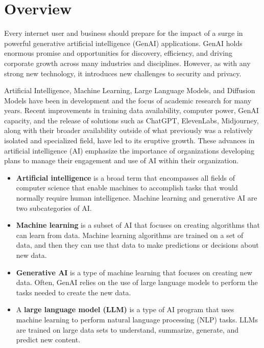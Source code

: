 \headerimage
\chapter{Overview}
Every internet user and business should prepare for the impact of a surge in
powerful generative artificial intelligence (GenAI) applications. GenAI holds
enormous promise and opportunities for discovery, efficiency, and driving
corporate growth across many industries and disciplines. However, as with any
strong new technology, it introduces new challenges to security and privacy.

Artificial Intelligence, Machine Learning, Large Language Models, and Diffusion
Models have been in development and the focus of academic research for many
years. Recent improvements in training data availability, computer power,
GenAI capacity, and the release of solutions such as ChatGPT, ElevenLabs,
Midjourney, along with their broader availability outside of what previously
was a relatively isolated and specialized field, have led to its eruptive
growth. These advances in artificial intelligence (AI) emphasize the importance
of organizations developing plans to manage their engagement and use of AI
within their organization.

\begin{itemize}
  \item \textbf{Artificial intelligence} is a broad term that encompasses all fields of
  computer science that enable machines to accomplish tasks that would normally
  require human intelligence. Machine learning and generative AI are two
  subcategories of AI.
  \item \textbf{Machine learning} is a subset of AI that focuses on creating algorithms
  that can learn from data. Machine learning algorithms are trained on a set of
  data, and then they can use that data to make predictions or decisions about
  new data.
  \item \textbf{Generative AI} is a type of machine learning that focuses on creating
  new data. Often, GenAI relies on the use of large language models to perform
  the tasks needed to create the new data.
  \item A \textbf{large language model (LLM)} is a type of AI program that uses machine
  learning to perform natural language processing (NLP) tasks. LLMs are trained
  on large data sets to understand, summarize, generate, and predict new
  content.
\end{itemize}

